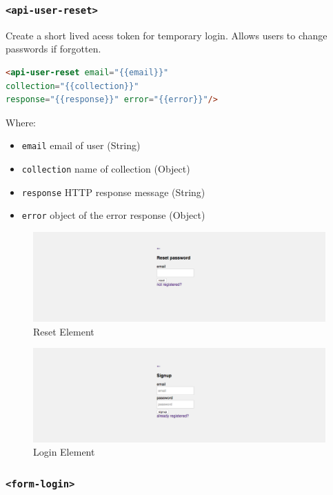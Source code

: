\subsubsection{\texttt{<api-user-reset>}}

Create a short lived acess token for temporary login. Allows users to change passwords if forgotten.
\begin{lstlisting}[language=html]
<api-user-reset email="{{email}}"
collection="{{collection}}" 
response="{{response}}" error="{{error}}"/>
\end{lstlisting}
Where:
\begin{itemize}
\item \texttt{email} email of user (String)
\item \texttt{collection} name of collection (Object)
\item \texttt{response}	HTTP response message (String)
\item \texttt{error} object of the error response (Object)
\end{itemize}

\begin {figure}[h]
\graphicspath{{images/chapter_USR/}}
\includegraphics[width=\textwidth]{usr3}
\caption{Reset Element}
\end {figure}

\begin {figure}[h]
\graphicspath{{images/chapter_USR/}}
\includegraphics[width=\textwidth]{usr4}
\caption{Login Element}
\end {figure}

\subsubsection{\texttt{<form-login>}}

